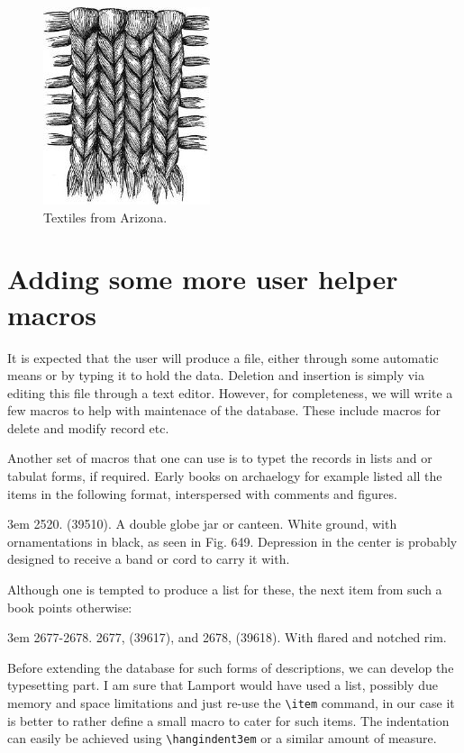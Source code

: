 \def\figurename{\textbf{Figure}}
\begin{figure}
\vspace*{1cm}
\centering
\includegraphics[scale=0.6]{./images/fig172.jpg}
\caption{Textiles from Arizona. }
\end{figure}

\section{Adding some more user helper macros}

It is expected that the user will produce a file, either through some automatic means or by typing it to hold the data. Deletion and insertion is simply via editing this file through a text editor. However, for completeness, we will write a few macros to help with maintenace of the database. These include macros for delete and modify record etc.

Another set of macros that one can use is to typet the records in lists and or tabulat forms, if required. Early books on archaelogy for example listed all the items in the following format, interspersed with comments and figures.
\smallskip


\hangindent3em
2520. (39510). A double globe jar or canteen. White ground, with ornamentations in black, as seen in Fig. 649. Depression in the center is probably designed to receive a band or cord to carry it with.
\smallskip

Although one is tempted to produce a list for these, the next item from such a book points otherwise:
\smallskip

\hangindent3em
2677-2678. 2677, (39617), and 2678, (39618). With flared and notched rim.
\smallskip

Before extending the database for such forms of descriptions, we can develop the typesetting part. I am sure that Lamport would have used a list, possibly due memory and space limitations and just re-use the \verb+\item+ command, in our case it is better to rather define a small macro
to cater for such items. The indentation can easily be achieved using \verb+\hangindent3em+ or a similar amount of measure.

